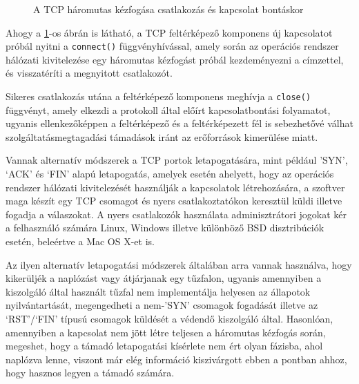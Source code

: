 \documentclass[a4paper,12pt]{article}
\begin{document}
	\begin{figure}[!htbp]
		\centering
		\caption{A TCP háromutas kézfogása csatlakozás és kapcsolat bontáskor}
		\label{tcp3way}
	\end{figure}
	
	Ahogy a \ref{tcp3way}-os ábrán is látható, a TCP feltérképező komponens új kapcsolatot próbál nyitni a \texttt{connect()} függvényhívással, amely során az operációs rendszer hálózati kivitelezése egy háromutas kézfogást próbál kezdeményezni a címzettel, és visszatéríti a megnyitott csatlakozót.
	
	Sikeres csatlakozás utána a feltérképező komponens meghívja a \texttt{close()} függvényt, amely elkezdi a protokoll által előírt kapcsolatbontási folyamatot, ugyanis ellenkezőképpen a feltérképező és a feltérképezett fél is sebezhetővé válhat szolgáltatásmegtagadási támadások iránt az erőforrások kimerülése miatt\cite{erickson08}.
	
	Vannak alternatív módszerek a TCP portok letapogatására, mint például 'SYN', `ACK' és `FIN' alapú letapogatás\cite{kris07}, amelyek esetén ahelyett, hogy az operációs rendszer hálózati kivitelezését használják a kapcsolatok létrehozására, a szoftver maga készít egy TCP csomagot és nyers csatlakoztatókon keresztül küldi illetve fogadja a válaszokat. A nyers csatlakozók használata adminisztrátori jogokat kér a felhasználó számára Linux, Windows illetve különböző BSD disztribúciók esetén, beleértve a Mac OS X-et is.
	
	Az ilyen alternatív letapogatási módszerek általában arra vannak használva, hogy kikerüljék a naplózást vagy átjárjanak egy tűzfalon, ugyanis amennyiben a kiszolgáló által használt tűzfal nem implementálja helyesen az állapotok nyilvántartását, megengedheti a nem-'SYN' csomagok fogadását illetve az `RST'/`FIN' típusú csomagok küldését a védendő kiszolgáló által. Hasonlóan, amennyiben a kapcsolat nem jött létre teljesen a háromutas kézfogás során, megeshet, hogy a támadó letapogatási kísérlete nem ért olyan fázisba, ahol naplózva lenne, viszont már elég információ kiszivárgott ebben a pontban ahhoz, hogy hasznos legyen a támadó számára.
	
\end{document}
